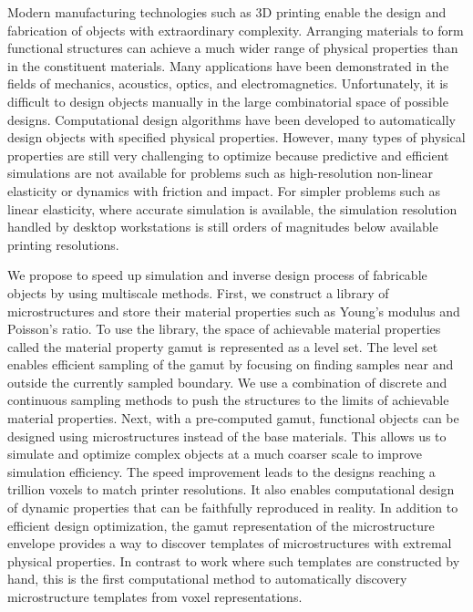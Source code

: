 % 
%
Modern manufacturing technologies such as 3D printing enable the design and fabrication of objects with extraordinary complexity.
Arranging materials to form functional structures can achieve a much wider range of physical properties than in the constituent materials.
Many applications have been demonstrated in the fields of mechanics, acoustics, optics, and electromagnetics.
Unfortunately, it is difficult to design objects manually in the large combinatorial space of possible designs.
Computational design algorithms have been developed to automatically design objects with specified physical properties.
However, many types of physical properties are still very challenging to optimize because predictive and efficient simulations are not available for 
problems such as high-resolution non-linear elasticity or dynamics with friction and impact.
For simpler problems such as linear elasticity, where accurate simulation is available,
the simulation resolution handled by desktop workstations is still orders of magnitudes below available printing resolutions.

We propose to speed up simulation and inverse design process of fabricable objects by using multiscale methods.
First, we construct a library of microstructures and store their material properties such as Young's modulus and Poisson's ratio.
To use the library, the space of achievable material properties called the material property gamut is represented as a level set.
The level set enables efficient sampling of the gamut by focusing on finding samples near and outside the currently sampled boundary.
We use a combination of discrete and continuous sampling methods to push the structures to the limits of achievable material properties.
Next, with a pre-computed gamut, functional objects can be designed using microstructures instead of the base materials.
This allows us to simulate and optimize complex objects at a much coarser scale to improve simulation efficiency.
The speed improvement leads to the designs reaching a trillion voxels to match printer resolutions.
It also enables computational design of dynamic properties that can be faithfully reproduced in reality.
In addition to efficient design optimization, 
the gamut representation of the microstructure envelope provides a way to discover templates of microstructures with extremal physical properties.
In contrast to work where such templates are constructed by hand,
this is the first computational method to automatically discovery microstructure templates from voxel representations.
